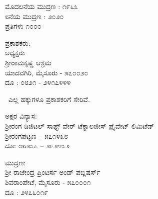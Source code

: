 \thispagestyle{empty}
\begin{flushleft}
{\fontsize{10}{12.5}\selectfont
ಮೊದಲನೆಯ ಮುದ್ರಣ : ೧೯೬೩\\
೮ನೆಯ ಮುದ್ರಣ : ೨೦೨೦\\
ಪ್ರತಿಗಳು ೧೦೦೦
\vfill

ಪ್ರಕಾಶಕರು:\\
ಅಧ್ಯಕ್ಷರು\\
ಶ‍್ರೀರಾಮಕೃಷ್ಣ ಆಶ್ರಮ\\
ಯಾದವಗಿರಿ, ಮೈಸೂರು - ೫೭೦೦೨೦\\
ದೂ : ೦೮೨೧ - ೨೪೧೭೪೪೪   
\vfill

\eng{\copyright}\ ಎಲ್ಲ ಹಕ್ಕುಗಳೂ ಪ್ರಕಾಶಕರಿಗೆ ಸೇರಿವೆ.
\vfill

ಅಕ್ಷರ ವಿನ್ಯಾಸ:\\ಶ‍್ರೀರಂಗ ಡಿಜಿಟಲ್ ಸಾಫ್ಟ್ ‍ವೇರ್ ಟೆಕ್ನಾಲಜೀಸ್ ಪ್ರೈವೇಟ್ ಲಿಮಿಟೆಡ್\\ಶ‍್ರೀರಂಗಪಟ್ಟಣ – ೫೭೧೪೩೮\\ ದೂ: ೦೮೨೩೬ – ೨೯೨೪೩೨
\vfill

ಮುದ್ರಣ:\\
ಶ‍್ರೀ ರಾಜೇಂದ್ರ ಪ್ರಿಂಟರ್ಸ ಅಂಡ್ ಪಬ್ಲಿಷರ್ಸ್ \\
ಶಿವರಾಂಪೇಟೆ, ಮೈಸೂರು - ೫೭೦೦೦೧\\
ದೂ : ೨೪೭೬೦೧೯
}
\end{flushleft}

